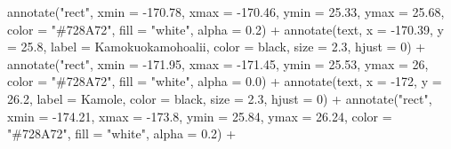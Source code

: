 \documentclass[
]{article}
\newenvironment{Shaded}{\begin{snugshade}}{\end{snugshade}}
\newcommand{\AttributeTok}[1]{\textcolor[rgb]{0.77,0.63,0.00}{#1}}
\newcommand{\DecValTok}[1]{\textcolor[rgb]{0.00,0.00,0.81}{#1}}
\newcommand{\FloatTok}[1]{\textcolor[rgb]{0.00,0.00,0.81}{#1}}
\newcommand{\FunctionTok}[1]{\textcolor[rgb]{0.00,0.00,0.00}{#1}}
\newcommand{\NormalTok}[1]{#1}
\newcommand{\SpecialCharTok}[1]{\textcolor[rgb]{0.00,0.00,0.00}{#1}}
\newcommand{\StringTok}[1]{\textcolor[rgb]{0.31,0.60,0.02}{#1}}
\begin{document}
\begin{Shaded}
\begin{Highlighting}[]
  \FunctionTok{annotate}\NormalTok{(}\StringTok{"rect"}\NormalTok{, }\AttributeTok{xmin =} \SpecialCharTok{{-}}\FloatTok{170.78}\NormalTok{, }\AttributeTok{xmax =} \SpecialCharTok{{-}}\FloatTok{170.46}\NormalTok{, }\AttributeTok{ymin =} \FloatTok{25.33}\NormalTok{, }\AttributeTok{ymax =} \FloatTok{25.68}\NormalTok{, }
           \AttributeTok{color =} \StringTok{"\#728A72"}\NormalTok{, }\AttributeTok{fill =} \StringTok{"white"}\NormalTok{, }\AttributeTok{alpha =} \FloatTok{0.2}\NormalTok{) }\SpecialCharTok{+}
  \FunctionTok{annotate}\NormalTok{(}\StringTok{\textquotesingle{}text\textquotesingle{}}\NormalTok{, }\AttributeTok{x =} \SpecialCharTok{{-}}\FloatTok{170.39}\NormalTok{, }\AttributeTok{y =} \FloatTok{25.8}\NormalTok{, }
           \AttributeTok{label =} \StringTok{\textquotesingle{}Kamokuokamohoalii\textquotesingle{}}\NormalTok{, }\AttributeTok{color =} \StringTok{\textquotesingle{}black\textquotesingle{}}\NormalTok{, }\AttributeTok{size =} \FloatTok{2.3}\NormalTok{, }\AttributeTok{hjust =} \DecValTok{0}\NormalTok{) }\SpecialCharTok{+}
  \FunctionTok{annotate}\NormalTok{(}\StringTok{"rect"}\NormalTok{, }\AttributeTok{xmin =} \SpecialCharTok{{-}}\FloatTok{171.95}\NormalTok{, }\AttributeTok{xmax =} \SpecialCharTok{{-}}\FloatTok{171.45}\NormalTok{, }\AttributeTok{ymin =} \FloatTok{25.53}\NormalTok{, }\AttributeTok{ymax =} \DecValTok{26}\NormalTok{, }
           \AttributeTok{color =} \StringTok{"\#728A72"}\NormalTok{, }\AttributeTok{fill =} \StringTok{"white"}\NormalTok{, }\AttributeTok{alpha =} \FloatTok{0.0}\NormalTok{) }\SpecialCharTok{+}
  \FunctionTok{annotate}\NormalTok{(}\StringTok{\textquotesingle{}text\textquotesingle{}}\NormalTok{, }\AttributeTok{x =} \SpecialCharTok{{-}}\DecValTok{172}\NormalTok{, }\AttributeTok{y =} \FloatTok{26.2}\NormalTok{, }
           \AttributeTok{label =} \StringTok{\textquotesingle{}Kamole\textquotesingle{}}\NormalTok{, }\AttributeTok{color =} \StringTok{\textquotesingle{}black\textquotesingle{}}\NormalTok{, }\AttributeTok{size =} \FloatTok{2.3}\NormalTok{, }\AttributeTok{hjust =} \DecValTok{0}\NormalTok{) }\SpecialCharTok{+}
  \FunctionTok{annotate}\NormalTok{(}\StringTok{"rect"}\NormalTok{, }\AttributeTok{xmin =} \SpecialCharTok{{-}}\FloatTok{174.21}\NormalTok{, }\AttributeTok{xmax =} \SpecialCharTok{{-}}\FloatTok{173.8}\NormalTok{, }\AttributeTok{ymin =} \FloatTok{25.84}\NormalTok{, }\AttributeTok{ymax =} \FloatTok{26.24}\NormalTok{, }
           \AttributeTok{color =} \StringTok{"\#728A72"}\NormalTok{, }\AttributeTok{fill =} \StringTok{"white"}\NormalTok{, }\AttributeTok{alpha =} \FloatTok{0.2}\NormalTok{) }\SpecialCharTok{+}

\end{Highlighting}
\end{Shaded}
\end{document}
